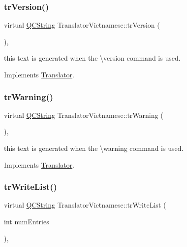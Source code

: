 \subsubsection{\texorpdfstring{trVersion()}{trVersion()}}
{\footnotesize\ttfamily virtual \mbox{\hyperlink{class_q_c_string}{Q\+C\+String}} Translator\+Vietnamese\+::tr\+Version (\begin{DoxyParamCaption}{ }\end{DoxyParamCaption})\hspace{0.3cm}{\ttfamily [inline]}, {\ttfamily [virtual]}}

this text is generated when the \textbackslash{}version command is used. 

Implements \mbox{\hyperlink{class_translator}{Translator}}.

\mbox{\label{class_translator_vietnamese_ade2f9cb0d07b7dbe26ebb76a8562562b}} 
\subsubsection{\texorpdfstring{trWarning()}{trWarning()}}
{\footnotesize\ttfamily virtual \mbox{\hyperlink{class_q_c_string}{Q\+C\+String}} Translator\+Vietnamese\+::tr\+Warning (\begin{DoxyParamCaption}{ }\end{DoxyParamCaption})\hspace{0.3cm}{\ttfamily [inline]}, {\ttfamily [virtual]}}

this text is generated when the \textbackslash{}warning command is used. 

Implements \mbox{\hyperlink{class_translator}{Translator}}.

\mbox{\label{class_translator_vietnamese_a9e37dca3640241e3c29516f2e756e346}} 
\subsubsection{\texorpdfstring{trWriteList()}{trWriteList()}}
{\footnotesize\ttfamily virtual \mbox{\hyperlink{class_q_c_string}{Q\+C\+String}} Translator\+Vietnamese\+::tr\+Write\+List (\begin{DoxyParamCaption}\item[{int}]{num\+Entries }\end{DoxyParamCaption})\hspace{0.3cm}{\ttfamily [inline]}, {\ttfamily [virtual]}}


